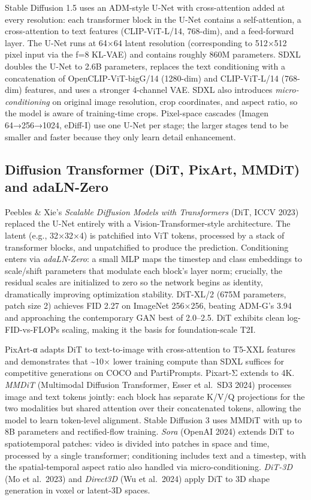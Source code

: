 \documentclass{article}
\begin{document}
Stable Diffusion 1.5 uses an ADM-style U-Net with cross-attention added at every resolution: each transformer block in the U-Net contains a self-attention, a cross-attention to text features (CLIP-ViT-L/14, 768-dim), and a feed-forward layer. The U-Net runs at 64×64 latent resolution (corresponding to 512×512 pixel input via the f=8 KL-VAE) and contains roughly 860M parameters. SDXL doubles the U-Net to 2.6B parameters, replaces the text conditioning with a concatenation of OpenCLIP-ViT-bigG/14 (1280-dim) and CLIP-ViT-L/14 (768-dim) features, and uses a stronger 4-channel VAE. SDXL also introduces \emph{micro-conditioning} on original image resolution, crop coordinates, and aspect ratio, so the model is aware of training-time crops. Pixel-space cascades (Imagen 64→256→1024, eDiff-I) use one U-Net per stage; the larger stages tend to be smaller and faster because they only learn detail enhancement.

\subsection{Diffusion Transformer (DiT, PixArt, MMDiT) and adaLN-Zero}\label{diffusion-transformer-dit-pixart-mmdit-and-adaln-zero}

Peebles \& Xie's \emph{Scalable Diffusion Models with Transformers} (DiT, ICCV 2023) replaced the U-Net entirely with a Vision-Transformer-style architecture. The latent (e.g., 32×32×4) is patchified into ViT tokens, processed by a stack of transformer blocks, and unpatchified to produce the prediction. Conditioning enters via \emph{adaLN-Zero}: a small MLP maps the timestep and class embeddings to scale/shift parameters that modulate each block's layer norm; crucially, the residual scales are initialized to zero so the network begins as identity, dramatically improving optimization stability. DiT-XL/2 (675M parameters, patch size 2) achieves FID 2.27 on ImageNet 256×256, beating ADM-G's 3.94 and approaching the contemporary GAN best of 2.0--2.5. DiT exhibits clean log-FID-vs-FLOPs scaling, making it the basis for foundation-scale T2I.

PixArt-α \citep{chen20242024} adapts DiT to text-to-image with cross-attention to T5-XXL features and demonstrates that \textasciitilde10× lower training compute than SDXL suffices for competitive generations on COCO and PartiPrompts. Pixart-Σ extends to 4K. \emph{MMDiT} (Multimodal Diffusion Transformer, Esser et al.~SD3 2024) processes image and text tokens jointly: each block has separate K/V/Q projections for the two modalities but shared attention over their concatenated tokens, allowing the model to learn token-level alignment. Stable Diffusion 3 uses MMDiT with up to 8B parameters and rectified-flow training. \emph{Sora} (OpenAI 2024) extends DiT to spatiotemporal patches: video is divided into patches in space and time, processed by a single transformer; conditioning includes text and a timestep, with the spatial-temporal aspect ratio also handled via micro-conditioning. \emph{DiT-3D} (Mo et al.~2023) and \emph{Direct3D} (Wu et al.~2024) apply DiT to 3D shape generation in voxel or latent-3D spaces.
\end{document}
